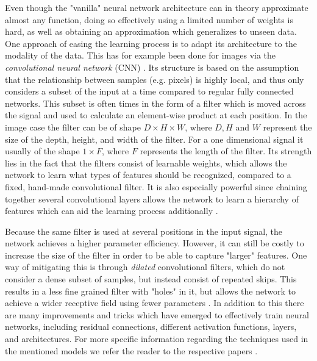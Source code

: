 \documentclass{article}
\begin{document}
Even though the "vanilla" neural network architecture can in theory approximate almost any function, doing so effectively using a limited number of weights is hard, as well as obtaining an approximation which generalizes to unseen data. One approach of easing the learning process is to adapt its architecture to the modality of the data. This has for example been done for images via the \textit{convolutional neural network} (CNN) \cite{lecun1989backpropagation}. Its structure is based on the assumption that the relationship between samples (e.g. pixels) is highly local, and thus only considers a subset of the input at a time compared to regular fully connected networks. This subset is often times in the form of a filter which is moved across the signal and used to calculate an element-wise product at each position. In the image case the filter can be of shape $D \times H \times W$, where $D, H$ and $W$ represent the size of the depth, height, and width of the filter. For a one dimensional signal it usually of the shape $1 \times F$, where $F$ represents the length of the filter. Its strength lies in the fact that the filters consist of learnable weights, which allows the network to learn what types of features should be recognized, compared to a fixed, hand-made convolutional filter. It is also especially powerful since chaining together several convolutional layers allows the network to learn a hierarchy of features which can aid the learning process additionally \cite{goodfellow2016deep}.

Because the same filter is used at several positions in the input signal, the network achieves a higher parameter efficiency. However, it can still be costly to increase the size of the filter in order to be able to capture "larger" features. One way of mitigating this is through \textit{dilated} convolutional filters, which do not consider a dense subset of samples, but instead consist of repeated skips. This results in a less fine grained filter with "holes" in it, but allows the network to achieve a wider receptive field using fewer parameters \cite{yu2015multi, oord2016wavenet}. In addition to this there are many improvements and tricks which have emerged to effectively train neural networks, including residual connections, different activation functions, layers, and architectures. For more specific information regarding the techniques used in the mentioned models we refer the reader to the respective papers \cite{kong2020diffwave, lee2021priorgrad, oord2016wavenet, tan2021survey}.
\end{document}
